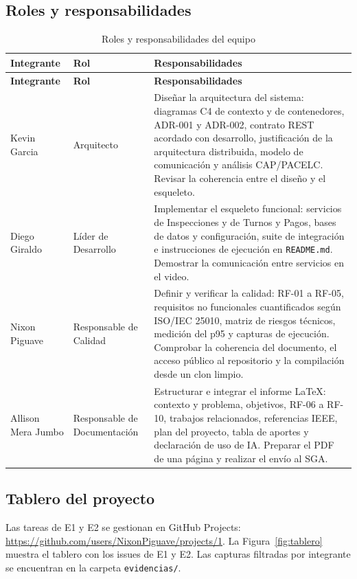 \documentclass[11pt,a4paper]{article}
\newcommand{\tablerourl}{\url{https://github.com/users/NixonPiguave/projects/1}}
\begin{document}
	\subsection{Roles y responsabilidades}
	\begin{xltabular}{\textwidth}{L{3.5cm}L{3.5cm}X}
		\caption{Roles y responsabilidades del equipo}\label{tab:roles}\\
		\toprule
		\textbf{Integrante} & \textbf{Rol} & \textbf{Responsabilidades} \\
		\midrule
		\endfirsthead
		\toprule
		\textbf{Integrante} & \textbf{Rol} & \textbf{Responsabilidades} \\
		\midrule
		\endhead
		\bottomrule
		\endfoot
		Kevin Garcia       & Arquitecto                   & Diseñar la arquitectura del sistema: diagramas C4 de contexto y de contenedores, ADR-001 y ADR-002, contrato REST acordado con desarrollo, justificación de la arquitectura distribuida, modelo de comunicación y análisis CAP/PACELC. Revisar la coherencia entre el diseño y el esqueleto. \\
		Diego Giraldo      & Líder de Desarrollo          & Implementar el esqueleto funcional: servicios de Inspecciones y de Turnos y Pagos, bases de datos y configuración, suite de integración e instrucciones de ejecución en \texttt{README.md}. Demostrar la comunicación entre servicios en el video. \\
		Nixon Piguave      & Responsable de Calidad       & Definir y verificar la calidad: RF-01 a RF-05, requisitos no funcionales cuantificados según ISO/IEC 25010, matriz de riesgos técnicos, medición del p95 y capturas de ejecución. Comprobar la coherencia del documento, el acceso público al repositorio y la compilación desde un clon limpio. \\
		Allison Mera Jumbo & Responsable de Documentación & Estructurar e integrar el informe LaTeX: contexto y problema, objetivos, RF-06 a RF-10, trabajos relacionados, referencias IEEE, plan del proyecto, tabla de aportes y declaración de uso de IA. Preparar el PDF de una página y realizar el envío al SGA. \\
	\end{xltabular}
	
	\subsection{Tablero del proyecto}
	Las tareas de E1 y E2 se gestionan en GitHub Projects: \tablerourl.
	La Figura~\ref{fig:tablero} muestra el tablero con los issues de E1 y E2. Las capturas filtradas por integrante se encuentran en la carpeta \texttt{evidencias/}.
	
\end{document}
